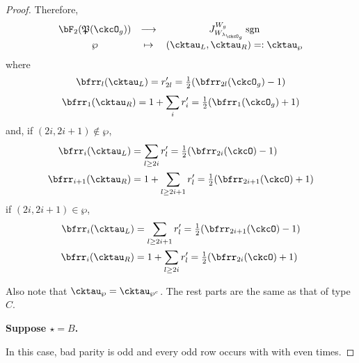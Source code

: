 \documentclass[12pt,a4paper]{amsart}
\newcommand{\sgn}{\operatorname{sgn}}
\numberwithin{equation}{section}
\theoremstyle{remark}
\def\half{{\tfrac{1}{2}}}
\def\lamckg{\lambda_{\ckcO_g}}
\def\CPP{\mathfrak{P}}
\begin{document}
\begin{proof}
{      Therefore,
      \[
        \begin{array}{ccc}
          \bF_{2}(\CPP(\ckcO_{g}))&\longrightarrow
          & J_{W_{\lamckg}}^{W_{g}} \sgn \\
          \wp&\mapsto&    (\cktau_{L},\cktau_{R}) =:\cktau_{\wp}
        \end{array}
      \]
      where
      \[
        \bfrr_{l}(\cktau_{L}) = r'_{2l} = \half (\bfrr_{2l}(\ckcO_{g})-1)
      \]
      \[
        \bfrr_{1}(\cktau_{R}) = 1+ \sum_{i} r'_{i} = \half (\bfrr_{1}(\ckcO_{g})+1)
      \]
      and, if $(2i,2i+1)\notin \wp$,
      \[
        \begin{split}
          \bfrr_{i}(\cktau_{L}) & = \sum_{l\geq 2i} r'_{l}
          = \half(\bfrr_{2i}(\ckcO)-1)\\
          \bfrr_{i+1}(\cktau_{R}) & = 1 + \sum_{l\geq 2i+1} r'_{l} = \half(\bfrr_{2i+1}(\ckcO)+1)
        \end{split}
      \]
      if $(2i,2i+1)\in \wp$,
      \[
        \begin{split}
          \bfrr_{i}(\cktau_{L}) & = \sum_{l\geq 2i+1} r'_{l}
          = \half(\bfrr_{2i+1}(\ckcO)-1)\\
          \bfrr_{i}(\cktau_{R}) & = 1 + \sum_{l\geq 2i} r'_{l} = \half(\bfrr_{2i}(\ckcO)+1)
        \end{split}
      \]

      Also note that $\cktau_{\wp}=\cktau_{\wp^{c}}$. The rest parts are the
      same as that of type $C$.

      {\bf Suppose $\star=B$. }

      In this case, bad parity is odd and every odd row occurs with with even
      times.

}
\end{proof}
\end{document}

